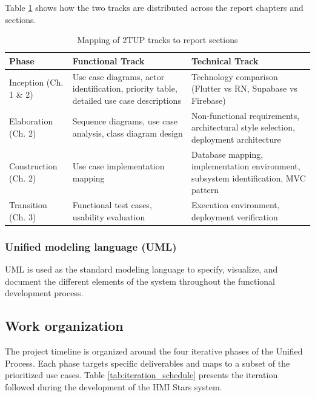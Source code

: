 Table \ref{tab:2tup_tracks} shows how the two tracks are distributed across the report chapters and sections.

\begin{table}[H]
\centering
\caption{Mapping of 2TUP tracks to report sections}
\label{tab:2tup_tracks}
\begin{tabular}{|l|p{5cm}|p{5cm}|}
\hline
\textbf{Phase} & \textbf{Functional Track} & \textbf{Technical Track} \\
\hline
Inception (Ch. 1 \& 2) & Use case diagrams, actor identification, priority table, detailed use case descriptions & Technology comparison (Flutter vs RN, Supabase vs Firebase) \\
\hline
Elaboration (Ch. 2) & Sequence diagrams, use case analysis, class diagram design & Non-functional requirements, architectural style selection, deployment architecture \\
\hline
Construction (Ch. 2) & Use case implementation mapping & Database mapping, implementation environment, subsystem identification, MVC pattern \\
\hline
Transition (Ch. 3) & Functional test cases, usability evaluation & Execution environment, deployment verification \\
\hline
\end{tabular}
\end{table}

\vspace{-0.5cm}
\subsubsection{Unified modeling language (UML)}
UML \cite{UMLSpec} is used as the standard modeling language to specify, visualize, and document the different elements of the system throughout the functional development process.
\subsection{Work organization}
The project timeline is organized around the four iterative phases of the Unified Process. Each phase targets specific deliverables and maps to a subset of the prioritized use cases. Table \ref{tab:iteration_schedule} presents the iteration followed during the development of the HMI Stars system.


